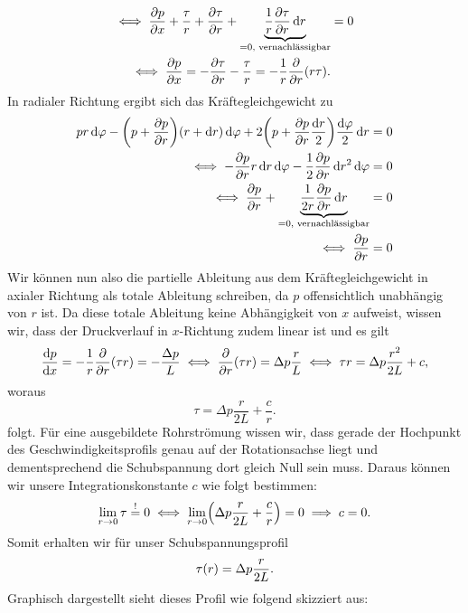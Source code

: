 \documentclass{exercise}
\begin{document}
\begin{enumerate}
\begin{align*}
            \iff \frac{\partial p}{\partial x} + \frac{\tau}{r} + \frac{\partial\tau}{\partial r} + \underbrace{\frac{1}{r}\frac{\partial\tau}{\partial r}\d r}_{= 0\text{, vernachlässigbar}} &= 0\\
            \iff \frac{\partial p}{\partial x} = -\frac{\partial\tau}{\partial r} - \frac{\tau}{r} = -\frac{1}{r}\frac{\partial}{\partial r}\parentheses*{r\tau}.
        \end{align*}
        In radialer Richtung ergibt sich das Kräftegleichgewicht zu
        \begin{align*}
            pr\d\varphi - \parentheses*{p + \frac{\partial p}{\partial r}}\parentheses*{r + \d r}\d\varphi + 2\parentheses*{p + \frac{\partial p}{\partial r}\frac{\d r}{2}}\frac{\d\varphi}{2}\d r &= 0\\
            \iff -\frac{\partial p}{\partial r}r\d r\d\varphi - \frac{1}{2}\frac{\partial p}{\partial r}\d r^2 \d\varphi &= 0\\
            \iff \frac{\partial p}{\partial r} + \underbrace{\frac{1}{2r}\frac{\partial p}{\partial r}\d r}_{= 0\text{, vernachlässigbar}} &= 0\\
            \iff \frac{\partial p}{\partial r} &= 0
        \end{align*}
        Wir können nun also die partielle Ableitung aus dem Kräftegleichgewicht in axialer Richtung als totale Ableitung schreiben, da \(p\) offensichtlich unabhängig von \(r\) ist.
        Da diese totale Ableitung keine Abhängigkeit von \(x\) aufweist, wissen wir, dass der Druckverlauf in \(x\)-Richtung zudem linear ist und es gilt
        \[
            \frac{\d p}{\d x} = -\frac{1}{r}\frac{\partial}{\partial r}\parentheses*{\tau r} = -\frac{\Delta p}{L} \iff \frac{\partial}{\partial r}\parentheses*{\tau r} = \Delta p\frac{r}{L} \iff \tau r = \Delta p\frac{r^2}{2L} + c,
        \]
        woraus
        \[
            \tau = \Delta p\frac{r}{2L} + \frac{c}{r}.
        \]
        folgt.
        Für eine ausgebildete Rohrströmung wissen wir, dass gerade der Hochpunkt des Geschwindigkeitsprofils genau auf der Rotationsachse liegt und dementsprechend die Schubspannung dort gleich Null sein muss.
        Daraus können wir unsere Integrationskonstante \(c\) wie folgt bestimmen:
        \[
            \lim_{r \to 0}\tau \stackrel{!}{=} 0 \iff \lim_{r \to 0}\parentheses*{\Delta p\frac{r}{2L} + \frac{c}{r}} = 0 \implies c = 0.
        \]
        Somit erhalten wir für unser Schubspannungsprofil
        \[
            \tau\parentheses*{r} = \Delta p\frac{r}{2L}.
        \]
        Graphisch dargestellt sieht dieses Profil wie folgend skizziert aus:

\end{enumerate}
\end{document}

